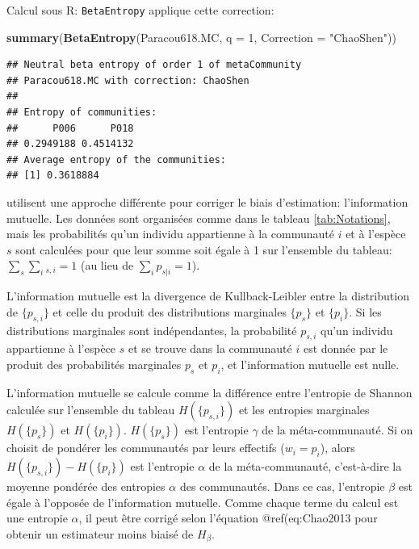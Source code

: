 \documentclass[
  11pt,
  french,
  a4paper,
  extrafontsizes,onecolumn,openright
  ]{memoir}
\newenvironment{Shaded}{\begin{snugshade}}{\end{snugshade}}
\newcommand{\DataTypeTok}[1]{\textcolor[rgb]{0.13,0.29,0.53}{#1}}
\newcommand{\DecValTok}[1]{\textcolor[rgb]{0.00,0.00,0.81}{#1}}
\newcommand{\KeywordTok}[1]{\textcolor[rgb]{0.13,0.29,0.53}{\textbf{#1}}}
\newcommand{\NormalTok}[1]{#1}
\newcommand{\StringTok}[1]{\textcolor[rgb]{0.31,0.60,0.02}{#1}}
\begin{document}
Calcul sous R: \texttt{BetaEntropy} applique cette correction:

\scriptsize

\begin{Shaded}
\begin{Highlighting}[]
\KeywordTok{summary}\NormalTok{(}\KeywordTok{BetaEntropy}\NormalTok{(Paracou618.MC, }\DataTypeTok{q =} \DecValTok{1}\NormalTok{, }\DataTypeTok{Correction =} \StringTok{"ChaoShen"}\NormalTok{))}
\end{Highlighting}
\end{Shaded}

\begin{verbatim}
## Neutral beta entropy of order 1 of metaCommunity 
## Paracou618.MC with correction: ChaoShen 
## 
## Entropy of communities: 
##      P006      P018 
## 0.2949188 0.4514132 
## Average entropy of the communities: 
## [1] 0.3618884
\end{verbatim}

\normalsize

\textcite{Chao2013} utilisent une approche différente pour corriger le biais d'estimation: l'information mutuelle.
Les données sont organisées comme dans le tableau \ref{tab:Notations}, mais les probabilités qu'un individu appartienne à la communauté \(i\) et à l'espèce \(s\) sont calculées pour que leur somme soit égale à 1 sur l'ensemble du tableau: \(\sum_s{\sum_i{_{s,i}}}=1\) (au lieu de \(\sum_i{p_{s|i}}=1\)).

L'information mutuelle est la divergence de Kullback-Leibler entre la distribution de \(\{p_{s,i}\}\) et celle du produit des distributions marginales \(\{p_s\}\) et \(\{p_i\}\).
Si les distributions marginales sont indépendantes, la probabilité \(p_{s,i}\) qu'un individu appartienne à l'espèce \(s\) et se trouve dans la communauté \(i\) est donnée par le produit des probabilités marginales \(p_s\) et \(p_i\), et l'information mutuelle est nulle.

L'information mutuelle se calcule comme la différence entre l'entropie de Shannon calculée sur l'ensemble du tableau \(H(\{p_{s,i}\})\) et les entropies marginales \(H(\{p_s\})\) et \(H(\{p_i\})\).
\(H(\{p_s\})\) est l'entropie \(\gamma\) de la méta-communauté.
Si on choisit de pondérer les communautés par leurs effectifs (\(w_i=p_i\)), alors \(H(\{p_{s,i}\})-H(\{p_i\})\) est l'entropie \(\alpha\) de la méta-communauté, c'est-à-dire la moyenne pondérée des entropies \(\alpha\) des communautés.
Dans ce cas, l'entropie \(\beta\) est égale à l'opposée de l'information mutuelle.
Comme chaque terme du calcul est une entropie \(\alpha\), il peut être corrigé selon l'équation @ref(eq:Chao2013 pour obtenir un estimateur moins biaisé de \(H_{\beta}\).
\end{document}
